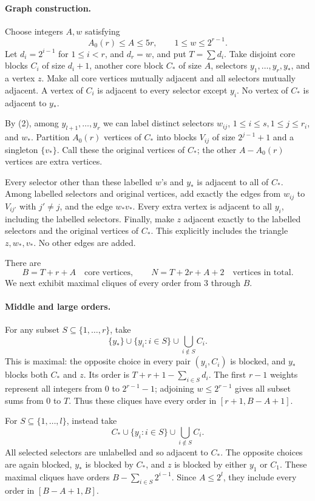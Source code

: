 \paragraph{Graph construction.}
Choose integers \(A,w\) satisfying
\[
 A_0(r)\leq A\leq5r,\qquad 1\leq w\leq2^{r-1}.
\]
Let \(d_i=2^{i-1}\) for \(1\leq i<r\), and \(d_r=w\), and put \(T=\sum d_i\). Take disjoint core blocks \(C_i\) of size \(d_i+1\), another core block \(C_*\) of size \(A\), selectors \(y_1,\ldots,y_r,y_*\), and a vertex \(z\). Make all core vertices mutually adjacent and all selectors mutually adjacent. A vertex of \(C_i\) is adjacent to every selector except \(y_i\). No vertex of \(C_*\) is adjacent to \(y_*\).

By (2), among \(y_{l+1},\ldots,y_r\) we can label distinct selectors
\(w_{ij}\), \(1\leq i\leq s,1\leq j\leq r_i\), and \(w_*\).
Partition \(A_0(r)\) vertices of \(C_*\) into blocks \(V_{ij}\) of size \(2^{j-1}+1\) and a singleton \(\{v_*\}\). Call these the original vertices of \(C_*\); the other \(A-A_0(r)\) vertices are extra vertices.

Every selector other than these labelled \(w\)'s and \(y_*\) is adjacent to all of \(C_*\). Among labelled selectors and original vertices, add exactly the edges from \(w_{ij}\) to \(V_{ij'}\) with \(j'\ne j\), and the edge \(w_*v_*\). Every extra vertex is adjacent to all \(y_i\), including the labelled selectors. Finally, make \(z\) adjacent exactly to the labelled selectors and the original vertices of \(C_*\). This explicitly includes the triangle \(z,w_*,v_*\). No other edges are added.

There are
\[
 B=T+r+A\quad\text{core vertices},\qquad
 N=T+2r+A+2\quad\text{vertices in total}. \tag{3}
\]
We next exhibit maximal cliques of every order from 3 through \(B\).

\paragraph{Middle and large orders.}
For any subset \(S\subseteq\{1,\ldots,r\}\), take
\[
 \{y_*\}\cup\{y_i:i\in S\}\cup\bigcup_{i\notin S}C_i.
\]
This is maximal: the opposite choice in every pair \((y_i,C_i)\) is blocked, and \(y_*\) blocks both \(C_*\) and \(z\). Its order is \(T+r+1-\sum_{i\in S}d_i\). The first \(r-1\) weights represent all integers from 0 to \(2^{r-1}-1\); adjoining \(w\leq2^{r-1}\) gives all subset sums from 0 to \(T\). Thus these cliques have every order in \([r+1,B-A+1]\).

For \(S\subseteq\{1,\ldots,l\}\), instead take
\[
 C_*\cup\{y_i:i\in S\}\cup\bigcup_{i\notin S}C_i.
\]
All selected selectors are unlabelled and so adjacent to \(C_*\). The opposite choices are again blocked, \(y_*\) is blocked by \(C_*\), and \(z\) is blocked by either \(y_1\) or \(C_1\). These maximal cliques have orders \(B-\sum_{i\in S}2^{i-1}\). Since \(A\leq2^l\), they include every order in \([B-A+1,B]\).

